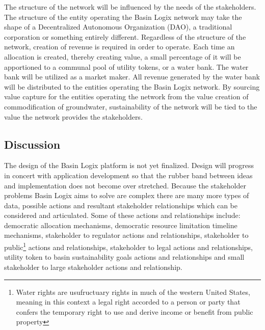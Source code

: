 \documentclass{tufte-handout}
\begin{document}
 The structure of the network will be influenced by the needs of the stakeholders. The structure of the entity operating the Basin Logix network may take the shape of a Decentralized Autonomous Organization (DAO), a traditional corporation or something entirely different. Regardless of the structure of the network, creation of revenue is required in order to operate. Each time an allocation is created, thereby creating value, a small percentage of it will be apportioned to a communal pool of utility tokens, or a water bank. The water bank will be utilized as a market maker. All revenue generated by the water bank will be distributed to the entities operating the Basin Logix network. By sourcing value capture for the entities operating the network from the value creation of commodification of groundwater, sustainability of the network will be tied to the value the network provides the stakeholders. 

\subsection{Discussion}\label{sec:headings}

The design of the Basin Logix platform is not yet finalized. Design will progress in concert with application development so that the rubber band between ideas and implementation does not become over stretched. Because the stakeholder problems Basin Logix aims to solve are complex there are many more types of data, possible actions and resultant stakeholder relationships which can be considered and articulated. Some of these actions and relationships include: democratic allocation mechanisms, democratic resource limitation timeline mechanisms, stakeholder to regulator actions and relationships, stakeholder to public\footnote{Water rights are usufructuary rights in much of the western United States, meaning in this context a legal right accorded to a person or party that confers the temporary right to use and derive income or benefit from public property} actions and relationships, stakeholder to legal actions and relationships, utility token to basin sustainability goals actions and relationships and small stakeholder to large stakeholder actions and relationship. 



\end{document}
